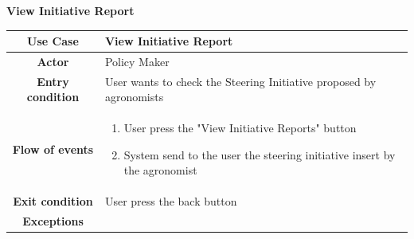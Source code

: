 \documentclass[table, 12pt]{article}
\begin{document}
\begin{itemize}
            
            \begin{table}[H]
                \item[] \textbf{View Initiative Report}
                \item[] 
                \centering
                \begin{tabular}{c m{}}
                    \hline
                    \textbf{Use Case} & View Initiative Report\\ \hline
                    \textbf{Actor} & Policy Maker\\ \hline
                    \textbf{Entry condition} & User wants to check the Steering Initiative proposed by agronomists\\  \hline
                    \textbf{Flow of events} & \begin{enumerate}
                                                \item User press the "View Initiative Reports" button
                                                \item System send to the user the steering initiative insert by the agronomist
                                            \end{enumerate}\\ \hline
                    \textbf{Exit condition} & User press the back button \\ \hline
                    \textbf{Exceptions} &  \\ \hline                    
                \end{tabular}
            \end{table}
                

\end{itemize}
\end{document}
